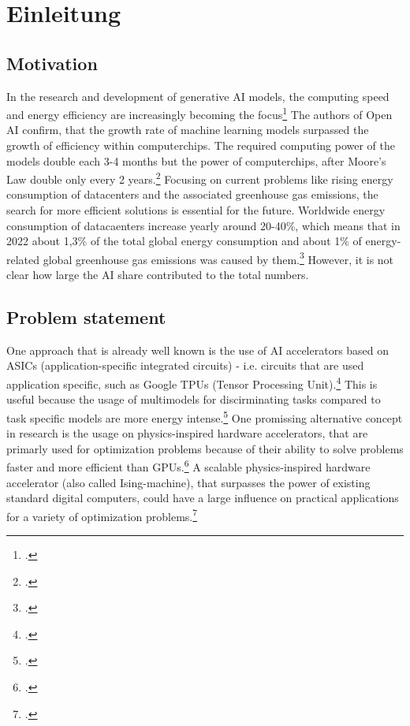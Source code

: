 \chapter{Einleitung}


\section{Motivation}

In the research and development of generative AI models, the computing speed and energy efficiency
are increasingly becoming the focus\footcite[Vgl.][1]{luccioniPowerHungryProcessing2023}
The authors of Open AI confirm, that the growth rate of machine learning models 
surpassed the growth of efficiency within computerchips.
The required computing power of the models double each 3-4 months but the power of computerchips, after Moore’s Law 
double only every 2 years.\footcite[Vgl.][1]{darioamodeiAICompute}
Focusing on current problems like rising energy consumption of datacenters and the associated
greenhouse gas emissions, the search for more efficient solutions is essential for the future.
Worldwide energy consumption of datacaenters increase yearly around 20-40\%, which
means that in 2022 about 1,3\% of the total global energy consumption and about 1\%
of energy-related global greenhouse gas emissions was caused by them.\footcite[Vgl.][1]{hintemannDataCenters20212022} 
However, it is not clear how large the AI share contributed to the total numbers.

\section{Problem statement}

One approach that is already well known is the use of AI accelerators based on
ASICs (application-specific integrated circuits) - i.e. circuits that are used application specific,
such as Google TPUs (Tensor Processing Unit).\footcite[Vgl.][39]{wittpahlKuenstlicheIntelligenzTechnologie2019} 
This is useful because the usage of multimodels for discirminating tasks compared to
task specific models are more energy intense.\footcite[Vgl.][5]{luccioniPowerHungryProcessing2023}
One promissing alternative concept in research is the usage on physics-inspired hardware accelerators, that are primarly used for optimization problems
because of their ability to solve problems faster and more efficient than GPUs.\footcite[Vgl.][1]{mohseniIsingMachinesHardware2022}
A scalable physics-inspired hardware accelerator (also called Ising-machine),
that surpasses the power of existing standard digital computers, could have a large influence
on practical applications for a variety of optimization problems.\footcite[Vgl.][1]{mohseniIsingMachinesHardware2022}

